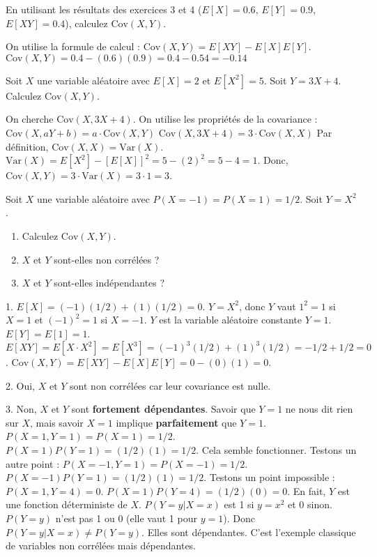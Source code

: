 \begin{exercicebox}[Covariance - 1]
En utilisant les résultats des exercices 3 et 4 ($E[X]=0.6$, $E[Y]=0.9$, $E[XY]=0.4$), calculez $\text{Cov}(X,Y)$.
\end{exercicebox}

\begin{correctionbox}
On utilise la formule de calcul : $\text{Cov}(X,Y) = E[XY] - E[X]E[Y]$.
$\text{Cov}(X,Y) = 0.4 - (0.6)(0.9) = 0.4 - 0.54 = -0.14$
\end{correctionbox}

\begin{exercicebox}[Covariance - 2]
Soit $X$ une variable aléatoire avec $E[X]=2$ et $E[X^2]=5$. Soit $Y = 3X + 4$.
Calculez $\text{Cov}(X,Y)$.
\end{exercicebox}

\begin{correctionbox}
On cherche $\text{Cov}(X, 3X+4)$. On utilise les propriétés de la covariance :
$\text{Cov}(X, aY+b) = a \cdot \text{Cov}(X,Y)$
$\text{Cov}(X, 3X+4) = 3 \cdot \text{Cov}(X,X)$
Par définition, $\text{Cov}(X,X) = \text{Var}(X)$.
$\text{Var}(X) = E[X^2] - [E[X]]^2 = 5 - (2)^2 = 5 - 4 = 1$.
Donc, $\text{Cov}(X,Y) = 3 \cdot \text{Var}(X) = 3 \cdot 1 = 3$.
\end{correctionbox}

\begin{exercicebox}
Soit $X$ une variable aléatoire avec $P(X=-1) = P(X=1) = 1/2$. Soit $Y=X^2$.
\begin{enumerate}
    \item Calculez $\text{Cov}(X,Y)$.
    \item $X$ et $Y$ sont-elles non corrélées ?
    \item $X$ et $Y$ sont-elles indépendantes ?
\end{enumerate}
\end{exercicebox}

\begin{correctionbox}
1. $E[X] = (-1)(1/2) + (1)(1/2) = 0$.
$Y=X^2$, donc $Y$ vaut $1^2=1$ si $X=1$ et $(-1)^2=1$ si $X=-1$. $Y$ est la variable aléatoire constante $Y=1$.
$E[Y] = E[1] = 1$.
$E[XY] = E[X \cdot X^2] = E[X^3] = (-1)^3(1/2) + (1)^3(1/2) = -1/2 + 1/2 = 0$.
$\text{Cov}(X,Y) = E[XY] - E[X]E[Y] = 0 - (0)(1) = 0$.

2. Oui, $X$ et $Y$ sont non corrélées car leur covariance est nulle.

3. Non, $X$ et $Y$ sont \textbf{fortement dépendantes}. Savoir que $Y=1$ ne nous dit rien sur $X$, mais savoir $X=1$ implique \textbf{parfaitement} que $Y=1$.
$P(X=1, Y=1) = P(X=1) = 1/2$.
$P(X=1)P(Y=1) = (1/2)(1) = 1/2$.
Cela semble fonctionner. Testons un autre point :
$P(X=-1, Y=1) = P(X=-1) = 1/2$.
$P(X=-1)P(Y=1) = (1/2)(1) = 1/2$.
Testons un point impossible :
$P(X=1, Y=4) = 0$.
$P(X=1)P(Y=4) = (1/2)(0) = 0$.
En fait, $Y$ est une fonction déterministe de $X$. $P(Y=y | X=x)$ est 1 si $y=x^2$ et 0 sinon. $P(Y=y)$ n'est pas 1 ou 0 (elle vaut 1 pour $y=1$). Donc $P(Y=y | X=x) \neq P(Y=y)$. Elles sont dépendantes. C'est l'exemple classique de variables non corrélées mais dépendantes.
\end{correctionbox}

